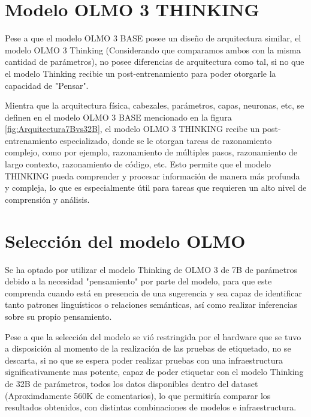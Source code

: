 \section{Modelo OLMO 3 THINKING}
\label{sec:olmo3thinking}
Pese a que el modelo OLMO 3 BASE posee un diseño de arquitectura similar, el modelo OLMO 3 Thinking (Considerando que comparamos ambos con la misma cantidad de parámetros), no posee diferencias de arquitectura como tal, si no que el modelo Thinking recibie un post-entrenamiento para poder otorgarle la capacidad de "Pensar".

Mientra que la arquitectura física, cabezales, parámetros, capas, neuronas, etc, se definen en el modelo OLMO 3 BASE mencionado en la figura \ref{fig:Arquitectura7Bvs32B}, el modelo OLMO 3 THINKING recibe un post-entrenamiento especializado, donde se le otorgan tareas de razonamiento complejo, como por ejemplo, razonamiento de múltiples pasos, razonamiento de largo contexto, razonamiento de código, etc. Esto permite que el modelo THINKING pueda comprender y procesar información de manera más profunda y compleja, lo que es especialmente útil para tareas que requieren un alto nivel de comprensión y análisis.

\section{Selección del modelo OLMO}

Se ha optado por utilizar el modelo Thinking de OLMO 3 de 7B de parámetros debido a la necesidad "pensamiento" por parte del modelo, para que este comprenda cuando está en presencia de una sugerencia y sea capaz de identificar tanto patrones linguísticos o relaciones semánticas, así como realizar inferencias sobre su propio pensamiento.

Pese a que la selección del modelo se vió restringida por el hardware que se tuvo a disposición al momento de la realización de las pruebas de etiquetado, no se descarta, si no que se espera poder realizar pruebas con una infraestructura significativamente mas potente, capaz de poder etiquetar con el modelo Thinking de 32B de parámetros, todos los datos disponibles dentro del dataset (Aproximdamente 560K de comentarios), lo que permitiría comparar los resultados obtenidos, con distintas combinaciones de modelos e infraestructura.

